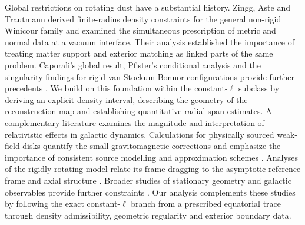 \documentclass[amsmath,amsfonts,amssymb,aps,pra,superscriptaddress,10pt]{revtex4-2}
\numberwithin{equation}{section}
\theoremstyle{plain}
\theoremstyle{definition}
\theoremstyle{remark}
\theoremstyle{definition}
\begin{document}
Global restrictions on rotating dust have a substantial history. Zingg, Aste and Trautmann \cite{ZinggAsteTrautmann2007ASTP} derived finite-radius density constraints for the general non-rigid Winicour family and examined the simultaneous prescription of metric and normal data at a vacuum interface. Their analysis established the importance of treating matter support and exterior matching as linked parts of the same problem. Caporali's global result, Pfister's conditional analysis and the singularity findings for rigid van Stockum-Bonnor configurations provide further precedents \cite{Caporali1978PLA, Pfister2010CQG, BratekJalochaKutschera2007PRD}. We build on this foundation within the constant-$\ell$ subclass by deriving an explicit density interval, describing the geometry of the reconstruction map and establishing quantitative radial-span estimates. A complementary literature examines the magnitude and interpretation of relativistic effects in galactic dynamics. Calculations for physically sourced weak-field disks quantify the small gravitomagnetic corrections and emphasize the importance of consistent source modelling and approximation schemes \cite{Ciotti2022ApJ, Lasenby2023CQG, GlampedakisJones2023CQG}. Analyses of the rigidly rotating model relate its frame dragging to the asymptotic reference frame and axial structure \cite{CostaEtAl2023PRD}. Broader studies of stationary geometry and galactic observables provide further constraints \cite{CostaNatario2024PRD, Ruggiero2024JCAP}. Our analysis complements these studies by following the exact constant-$\ell$ branch from a prescribed equatorial trace through density admissibility, geometric regularity and exterior boundary data.
\end{document}
